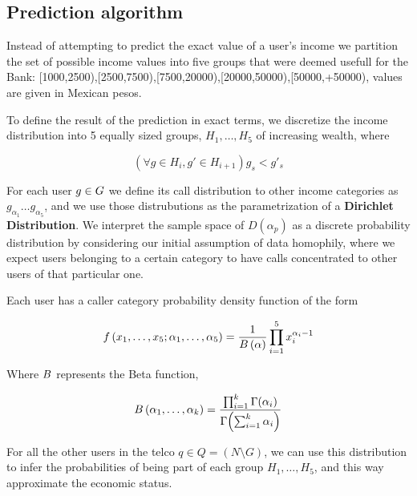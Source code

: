 \subsection{Prediction algorithm}

Instead of attempting to predict the exact value of a user's income we partition the set of possible income values into five groups that were deemed usefull for the Bank: [1000,2500),[2500,7500),[7500,20000),[20000,50000),[50000,+50000), values are given in Mexican pesos.  

To define the result of the prediction in exact terms, we discretize the income distribution into 5 equally sized groups, $ H_1, \ldots, H_5 $ of increasing wealth, where

\[
\left( \forall g \in H_i, g' \in H_{i + 1} \right) g_s < g'_s
\]

For each user $ g \in \mathlarger{G} $ we define its call distribution to other income categories as $ g_{\alpha_1} \ldots g_{\alpha_5} $, and we use those distrubutions as the parametrization of a \textbf{Dirichlet Distribution}. We interpret the sample space of $ D(\alpha_p) $ as a discrete probability distribution by considering our initial assumption of data homophily, where we expect users belonging to a certain category to have calls concentrated to other users of that particular one.

Each user has a caller category probability density function of the form

\[
f \left( x_1, \ldots, x_5; \alpha_1, \ldots, \alpha_5 \right) = \frac{1}{B \left( \alpha \right)} \prod^5_{i = 1} x_i^{\alpha_i - 1}
\]

Where $ B $ represents the Beta function,

\[
B \left( \alpha_1, \ldots, \alpha_k \right) = \frac{\prod^k_{i = 1} \Gamma \! \left( \alpha_i \right)}{\Gamma \! \left( \sum^k_{i = 1} \alpha_i \right) }
\]

For all the other users in the telco $ q \in Q = (N \setminus G) $, we can use this distribution to infer the probabilities of being part of each group $ H_1, \ldots, H_5 $, and this way approximate the economic status.
